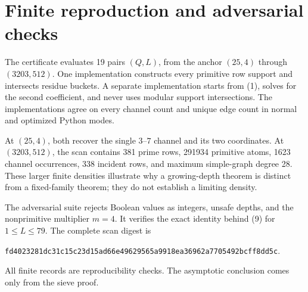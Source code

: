 \section{Finite reproduction and adversarial checks}

The certificate evaluates 19 pairs \((Q,L)\), from the anchor
\((25,4)\) through \((3203,512)\).  One implementation constructs every
primitive row support and intersects residue buckets.  A separate
implementation starts from (1), solves for the second coefficient, and never
uses modular support intersections.  The implementations agree on every
channel count and unique edge count in normal and optimized Python modes.

At \((25,4)\), both recover the single \(3\)--\(7\) channel and its two
coordinates.  At \((3203,512)\), the scan contains 381 prime rows, 291934
primitive atoms, 1623 channel occurrences, 338 incident rows, and maximum
simple-graph degree 28.  These larger finite densities illustrate why a
growing-depth theorem is distinct from a fixed-family theorem; they do not
establish a limiting density.

The adversarial suite rejects Boolean values as integers, unsafe depths,
and the nonprimitive multiplier \(m=4\).  It verifies the exact identity
behind (9) for \(1\le L\le79\).  The complete scan digest is
\begin{center}
\texttt{fd4023281dc31c15c23d15ad66e49629565a9918ea36962a7705492bcff8dd5c}.
\end{center}
All finite records are reproducibility checks.  The asymptotic conclusion
comes only from the sieve proof.
